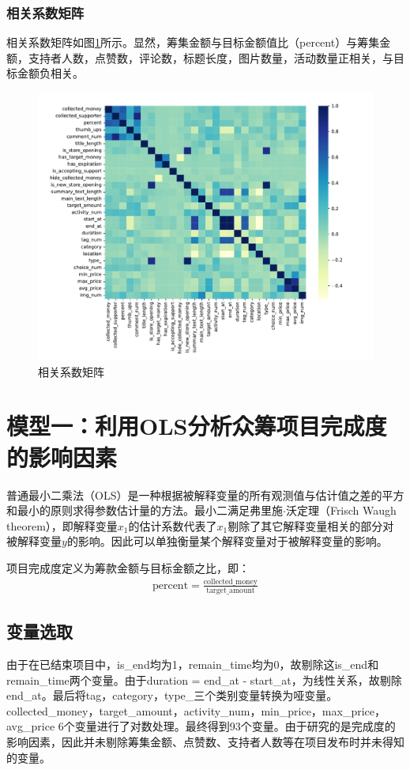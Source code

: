 \documentclass[lang=cn,a4paper]{elegantpaper}
\begin{document}
\subsubsection*{相关系数矩阵}
相关系数矩阵如图\ref{fig:corr}所示。显然，筹集金额与目标金额值比（percent）与筹集金额，支持者人数，点赞数，评论数，标题长度，图片数量，活动数量正相关，与目标金额负相关。
\begin{figure}[!htbp]
  \centering
  \includegraphics[width=\linewidth]{image/heatmap.pdf}
  \caption{相关系数矩阵}
  \label{fig:corr}
\end{figure}


\section{模型一：利用OLS分析众筹项目完成度的影响因素}
普通最小二乘法（OLS）是一种根据被解释变量的所有观测值与估计值之差的平方和最小的原则求得参数估计量的方法。最小二满足弗里施$\cdot$沃定理（Frisch Waugh theorem），即解释变量$x_1$的估计系数代表了$x_1$剔除了其它解释变量相关的部分对被解释变量$y$的影响。因此可以单独衡量某个解释变量对于被解释变量的影响。

项目完成度定义为筹款金额与目标金额之比，即：
\begin{align*}
\text{percent} = \frac{\text{collected\_money}}{\text{target\_amount}}
\end{align*}

\subsection{变量选取}
由于在已结束项目中，is\_end均为1，remain\_time均为0，故剔除这is\_end和remain\_time两个变量。由于duration = end\_at - start\_at，为线性关系，故剔除end\_at。最后将tag，category，type\_三个类别变量转换为哑变量。collected\_money，target\_amount，activity\_num，min\_price，max\_price，avg\_price 6个变量进行了对数处理。最终得到93个变量。由于研究的是完成度的影响因素，因此并未剔除筹集金额、点赞数、支持者人数等在项目发布时并未得知的变量。
\end{document}
